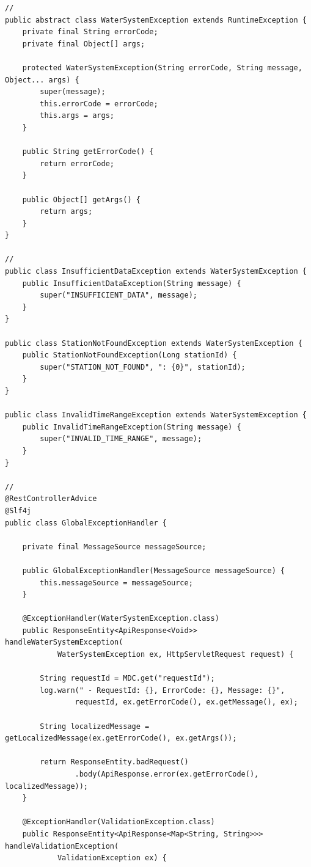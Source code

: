 \begin{lstlisting}[style=java]
// 
public abstract class WaterSystemException extends RuntimeException {
    private final String errorCode;
    private final Object[] args;
    
    protected WaterSystemException(String errorCode, String message, Object... args) {
        super(message);
        this.errorCode = errorCode;
        this.args = args;
    }
    
    public String getErrorCode() {
        return errorCode;
    }
    
    public Object[] getArgs() {
        return args;
    }
}

// 
public class InsufficientDataException extends WaterSystemException {
    public InsufficientDataException(String message) {
        super("INSUFFICIENT_DATA", message);
    }
}

public class StationNotFoundException extends WaterSystemException {
    public StationNotFoundException(Long stationId) {
        super("STATION_NOT_FOUND", ": {0}", stationId);
    }
}

public class InvalidTimeRangeException extends WaterSystemException {
    public InvalidTimeRangeException(String message) {
        super("INVALID_TIME_RANGE", message);
    }
}

// 
@RestControllerAdvice
@Slf4j
public class GlobalExceptionHandler {
    
    private final MessageSource messageSource;
    
    public GlobalExceptionHandler(MessageSource messageSource) {
        this.messageSource = messageSource;
    }
    
    @ExceptionHandler(WaterSystemException.class)
    public ResponseEntity<ApiResponse<Void>> handleWaterSystemException(
            WaterSystemException ex, HttpServletRequest request) {
        
        String requestId = MDC.get("requestId");
        log.warn(" - RequestId: {}, ErrorCode: {}, Message: {}", 
                requestId, ex.getErrorCode(), ex.getMessage(), ex);
        
        String localizedMessage = getLocalizedMessage(ex.getErrorCode(), ex.getArgs());
        
        return ResponseEntity.badRequest()
                .body(ApiResponse.error(ex.getErrorCode(), localizedMessage));
    }
    
    @ExceptionHandler(ValidationException.class)
    public ResponseEntity<ApiResponse<Map<String, String>>> handleValidationException(
            ValidationException ex) {
        

\end{lstlisting}

